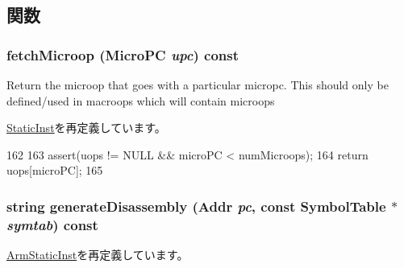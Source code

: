 \subsection{関数}
\hypertarget{classArmISA_1_1SrsOp_ae9e7acd6304ee397f1ab470e283ae76b}{
\subsubsection[{fetchMicroop}]{ fetchMicroop ({\bf MicroPC} {\em upc}) const}}
\label{classArmISA_1_1SrsOp_ae9e7acd6304ee397f1ab470e283ae76b}
Return the microop that goes with a particular micropc. This should only be defined/used in macroops which will contain microops 

\hyperlink{classStaticInst_aa5c7e6f7323850b84dbf5b8e47856173}{StaticInst}を再定義しています。


\begin{DoxyCode}
162     {
163         assert(uops != NULL && microPC < numMicroops);
164         return uops[microPC];
165     }
\end{DoxyCode}
\hypertarget{classArmISA_1_1SrsOp_a3134956ec18bb095818e06eb988f6c55}{
\subsubsection[{generateDisassembly}]{\setlength{\rightskip}{0pt plus 5cm}string generateDisassembly ({\bf Addr} {\em pc}, \/  const SymbolTable $\ast$ {\em symtab}) const}}
\label{classArmISA_1_1SrsOp_a3134956ec18bb095818e06eb988f6c55}


\hyperlink{classArmISA_1_1ArmStaticInst_a95d323a22a5f07e14d6b4c9385a91896}{ArmStaticInst}を再定義しています。


